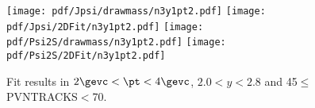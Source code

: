 \begin{figure}[H]
\begin{center}
\texttt{[image: pdf/Jpsi/drawmass/n3y1pt2.pdf]}
\texttt{[image: pdf/Jpsi/2DFit/n3y1pt2.pdf]}
\vspace*{-0.5cm}
\texttt{[image: pdf/Psi2S/drawmass/n3y1pt2.pdf]}
\texttt{[image: pdf/Psi2S/2DFit/n3y1pt2.pdf]}
\vspace*{-0.5cm}
\end{center}
\caption{Fit results in $2\gevc<\pt<4\gevc$, $2.0<y<2.8$ and 45$\leq$PVNTRACKS$<$70.}
\label{Fitn3y1pt2}
\end{figure}
